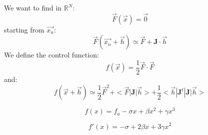 \documentclass[aps,12pt]{revtex4}
\begin{document}
We want to find in $\mathbb{R}^N$:
\begin{equation}
	\vec{F}(\vec{x}) = \vec{0}
\end{equation}
starting from $\vec{x_n}$:
\begin{equation}
	\vec{F}(\vec{x_n}+\vec{h}) \simeq \vec{F} + \bm{J} \cdot \vec{h}
\end{equation}
We define the control function:
\begin{equation}
	f(\vec{x}) = \dfrac{1}{2} \vec{F} \cdot \vec{F}
\end{equation}
and:
\begin{equation}
	f(\vec{x}+\vec{h}) \simeq \dfrac{1}{2}\vec{F}^2 + <\vec{F} | \bm{J} | \vec{h} > + \dfrac{1}{2} <\vec{h}|\bm{J}^t | \bm{J} | \vec{h}>
\end{equation}

\begin{equation}
	f(x) = f_a - \sigma x + \beta x^2 + \gamma x^3
\end{equation}

\begin{equation}
	f'(x) =   - \sigma  + 2\beta x + 3\gamma x^2
\end{equation}
\end{document}

